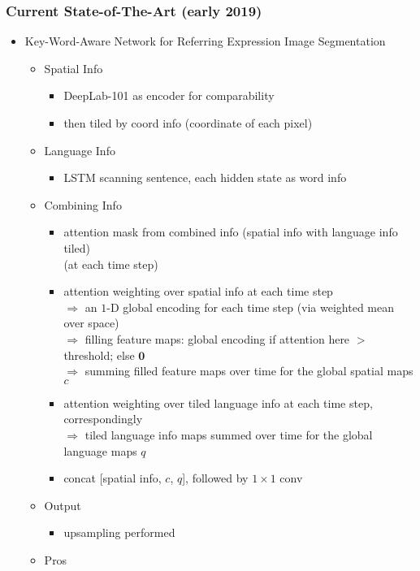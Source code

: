 \subsubsection{Current State-of-The-Art (early 2019)}
\begin{itemize}
\item Key-Word-Aware Network for Referring Expression Image Segmentation
	\begin{itemize}
	\item Spatial Info
		\begin{itemize}
		\item DeepLab-101 as encoder for comparability
		\item then tiled by coord info (coordinate of each pixel)
		\end{itemize}
	\item Language Info
		\begin{itemize}
		\item LSTM scanning sentence, each hidden state as word info
		\end{itemize}
	\item Combining Info
		\begin{itemize}
		\item attention mask from combined info (spatial info with language info tiled) \\
		(at each time step)
		\item attention weighting over spatial info at each time step \\
		$\Rightarrow$ an $1$-D global encoding for each time step (via weighted mean over space) \\
		$\Rightarrow$ filling feature maps: global encoding if attention here $>$ threshold; else $\mathbf 0$ \\
		$\Rightarrow$ summing filled feature maps over time for the global spatial maps $c$
		\item attention weighting over tiled language info at each time step, correspondingly \\
		$\Rightarrow$ tiled language info maps summed over time for the global language maps $q$
		\item concat [spatial info, $c$, $q$], followed by $1\times1$ conv
		\end{itemize}
	\item Output
		\begin{itemize}
		\item upsampling performed
		\end{itemize}
	\item Pros

\end{itemize}
\end{itemize}
